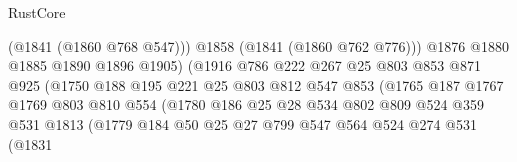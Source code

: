 \begin{lexlean}{RustCore}
\begin{coremodule}
                                        (@1841 (@1860 @768 @547)))
                                      @1858
                                      (@1841 (@1860 @762 @776)))
                                    @1876
                                    @1880
                                    @1885
                                    @1890
                                    @1896
                                    @1905)
                                  (@1916
                                    @786
                                    @222
                                    @267
                                    @25
                                    @803
                                    @853
                                    @871
                                    @925
                                    (@1750
                                      @188
                                      @195
                                      @221
                                      @25
                                      @803
                                      @812
                                      @547
                                      @853
                                      (@1765
                                        @187
                                        @1767
                                        @1769
                                        @803
                                        @810
                                        @554
                                        (@1780
                                          @186
                                          @25
                                          @28
                                          @534
                                          @802
                                          @809
                                          @524
                                          @359
                                          @531
                                          @1813
                                          (@1779
                                            @184
                                            @50
                                            @25
                                            @27
                                            @799
                                            @547
                                            @564
                                            @524
                                            @274
                                            @531
                                            (@1831

\end{coremodule}
\end{lexlean}
